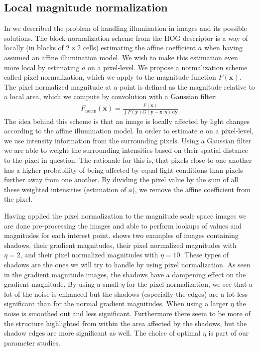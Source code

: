 \documentclass[thesis.tex]{subfiles}
\def\x{\mathbf{x}}
\def\y{\mathbf{y}}
\begin{document}
\subsection{Local magnitude normalization}
\label{sec:localMagnitudeNormalization}
%
In  we described the problem of handling illumination in images and its possible solutions. The block-normalization scheme from the HOG descriptor \cite{dalal2005histograms} is a way of locally (in blocks of $2 \times 2$ cells) estimating the affine coefficient $a$ when having assumed an affine illumination model. We wish to make this estimation even more local by estimating $a$ on a pixel-level. We propose a normalization scheme called pixel normalization, which we apply to the magnitude function $F(\x)$.
The pixel normalized magnitude at a point is defined as the magnitude relative to a local area, which we compute by convolution with a Gaussian filter:
%
\begin{align}
F_\text{norm}(\x) = \frac{F(\x)}{\int F(\y) G(\y - \x; \eta) \,\text{d} \y}
\end{align}
%
The idea behind this scheme is that an image is locally affected by light changes according to the affine illumination model. In order to estimate $a$ on a pixel-level, we use intensity information from the surrounding pixels. Using a Gaussian filter we are able to weight the surrounding intensities based on their spatial distance to the pixel in question. The rationale for this is, that pixels close to one another has a higher probability of being affected by equal light conditions than pixels further away from one another. By dividing the pixel value by the sum of all these weighted intensities (estimation of $a$), we remove the affine coefficient from the pixel.

Having applied the pixel normalization to the magnitude scale space images we are done pre-processing the images and able to perform lookups of values and magnitudes for each interest point.
 shows two examples of images containing shadows, their gradient magnitudes, their pixel normalized magnitudes with $\eta = 2$, and their pixel normalized magnitudes with $\eta = 10$. These types of shadows are the ones we will try to handle by using pixel normalization. As seen in the gradient magnitude images, the shadows have a dampening effect on the gradient magnitude. By using a small $\eta$ for the pixel normalization, we see that a lot of the noise is enhanced but the shadows (especially the edges) are a lot less significant than for the normal gradient magnitudes. When using a larger $\eta$ the noise is smoothed out and less significant. Furthermore there seem to be more of the structure highlighted from within the area affected by the shadows, but the shadow edges are more significant as well. The choice of optimal $\eta$ is part of our parameter studies.
\end{document}

